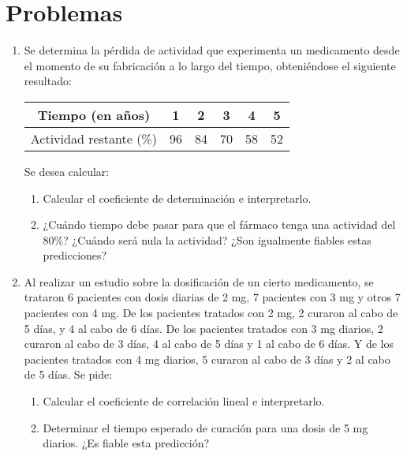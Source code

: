 \section{Problemas}
\begin{enumerate}[leftmargin=*]
\item  Se determina la pérdida de actividad que experimenta un
medicamento desde el momento de su fabricación a lo largo del tiempo, obteniéndose
el siguiente resultado:

\begin{center}
\begin{tabular}{|c|c|c|c|c|c|}
\hline Tiempo (en años) & 1 & 2 & 3 & 4 & 5 \\ \hline Actividad restante (\%) & 96 &
84 & 70 & 58 & 52 \\ \hline
\end{tabular}
\end{center}

Se desea calcular:

\begin{enumerate}
\item  Calcular el coeficiente de determinación e interpretarlo.

\item ¿Cuándo tiempo debe pasar para que el fármaco tenga una actividad del 80\%? ¿Cuándo será nula la actividad? ¿Son igualmente fiables estas predicciones?
\end{enumerate}

\item Al realizar un estudio sobre la dosificación de un cierto
medicamento, se trataron 6 pacientes con dosis diarias de 2 mg, 7 pacientes con 3 mg
y otros 7 pacientes con 4 mg. De los pacientes tratados con 2 mg, 2 curaron al cabo
de 5 días, y 4 al cabo de 6 días. De los pacientes tratados con 3 mg diarios, 2
curaron al cabo de 3 días, 4 al cabo de 5 días y 1 al cabo de 6 días. Y de los
pacientes tratados con 4 mg diarios, 5 curaron al cabo de 3 días y 2 al cabo de 5
días. Se pide:

\begin{enumerate}
\item  Calcular el coeficiente de correlación lineal e interpretarlo.

\item  Determinar el tiempo esperado de curación para una dosis de 5 mg diarios. ¿Es fiable esta predicción?

\end{enumerate}

\end{enumerate}

